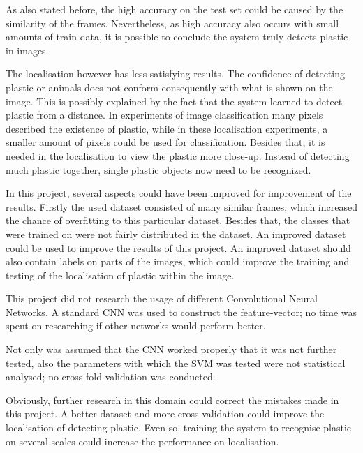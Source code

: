 As also stated before, the high accuracy on the test set could be caused by the similarity of the frames.
Nevertheless, as high accuracy also occurs with small amounts of train-data, it is possible to conclude the system truly detects plastic in images.

The localisation however has less satisfying results.
The confidence of detecting plastic or animals does not conform consequently with what is shown on the image.
This is possibly explained by the fact that the system learned to detect plastic from a distance.
In experiments of image classification many pixels described the existence of plastic, while in these localisation experiments, a smaller amount of pixels could be used for classification.
Besides that, it is needed in the localisation to view the plastic more close-up.
Instead of detecting much plastic together, single plastic objects now need to be recognized.

In this project, several aspects could have been improved for improvement of the results.
Firstly the used dataset consisted of many similar frames, which increased the chance of overfitting to this particular dataset.
Besides that, the classes that were trained on were not fairly distributed in the dataset.
An improved dataset could be used to improve the results of this project.
An improved dataset should also contain labels on parts of the images, which could improve the training and testing of the localisation of plastic within the image.

This project did not research the usage of different Convolutional Neural Networks.
A standard CNN was used to construct the feature-vector; no time was spent on researching if other networks would perform better.

Not only was assumed that the CNN worked properly that it was not further tested, also the parameters with which the SVM was tested were not statistical analysed; no cross-fold validation was conducted.


Obviously, further research in this domain could correct the mistakes made in this project.
A better dataset and more cross-validation could improve the localisation of detecting plastic.
Even so, training the system to recognise plastic on several scales could increase the performance on localisation.

